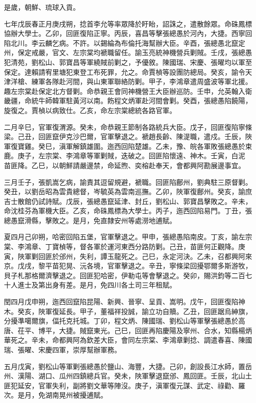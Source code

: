 \begin{pinyinscope}
是歲，朝鮮、琉球入貢。

七年戊辰春正月庚戌朔，捻首李允等率眾降於盱眙，詔誅之，遣散餘眾。命硃鳳標協辦大學士。乙卯，回匪復陷正寧。丙辰，喜昌等擊張總愚於河內，大捷。西寧回陷北川。李云麟乞病。不許。以錫綸為布倫托海幫辦大臣。辛酉，張總愚北竄定州，保定戒嚴，官文、左宗棠均褫職留任。諭玉亮統神機營兵剿賊。壬戌，張總愚犯清苑，劉松山、郭寶昌等軍繞賊前剿之，予優敘。陳國瑞、宋慶、張曜均以軍至保定。達賴請宥里塘犯東登工布死罪，允之。命賈楨等設團防總局。癸亥，諭令天津洋槍、練軍各隊赴河間，與山東軍聯絡防剿。甲子，李鴻章遣周盛波等軍北援。趣左宗棠赴保定北方督剿。命恭親王會同神機營王大臣辦巡防。壬申，允英翰入衛畿疆，命統牛師韓軍駐黃河以南。飭程文炳軍赴河間會剿。癸酉，張總愚陷饒陽，旋復之。賈楨以病致仕。乙亥，命左宗棠總統各路官軍。

二月辛巳，官軍復渭源。癸未，命恭親王節制各路統兵大臣。戊子，回匪復陷寧條梁。己丑，回匪竄伊克沙巴爾，官軍擊退之。褫趙長齡、陳湜職，遣戍。壬辰，陜軍復寶雞。癸巳，滇軍解鎮雄圍。迤西回陷楚雄。乙未，豫、皖各軍敗張總愚於束鹿。庚子，左宗棠、李鴻章等軍剿賊，迭破之。回匪陷懷遠、神木。壬寅，白泥苗匪降。乙巳，以朝鮮請嚴邊禁，命延煦、奕榕赴奉天，會都興阿勘展邊事宜。

三月壬子，張凱嵩乞病，諭責其逗留規避，褫職。回匪陷鄜州，劉典駐三原督剿。癸丑，以劉岳昭為雲貴總督，岑毓英為雲南巡撫。乙卯，陜軍復鄜州。癸亥，諭庶吉士散館仍試詩賦。戊辰，張總愚竄延津、封丘，劉松山、郭寶昌擊敗之。辛未，命沈桂芬為軍機大臣。乙亥，命硃鳳標為大學士。丙子，迤西回陷易門。丁丑，張總愚竄滑縣，擊敗之。是月，免直隸安州等處澇地逋賦。

夏四月己卯朔，哈密回陷五堡，官軍擊退之。甲申，張總愚陷南皮。丁亥，諭左宗棠、李鴻章、丁寶楨等，督各軍於運河東西分路防剿。己丑，苗匪何正觀降。庚寅，陜軍剿回匪於邠州，失利，譚玉龍死之。己巳，永定河決。乙未，召都興阿來京。戊戌，黎平苗犯晃、沅各境，官軍擊退之。辛丑，寧條梁回擾鄂爾多斯游牧，貝子札那格爾濟擊退之。回匪犯哈密，伊勒屯等會擊退之。癸卯，賜洪鈞等二百七十人進士及第出身有差。是月，免四川各土司三年租賦。

閏四月戊申朔，迤西回竄陷昆陽、新興、晉寧、呈貢、嵩明。戊午，回匪復陷神木。癸亥，陜軍復延長。甲子，董福祥投誠，諭立功自贖。乙丑，回匪踞烏紳旗，分擾準噶爾旗，偪托克托城。丁卯，程文炳、陳國瑞、劉松山等軍擊張總愚於高唐、茌平、博平，大捷。賊竄東光。己巳，回匪再陷慶陽及寧州、合水，知縣楊炳華死之。辛未，命都興阿為欽差大臣，會同左宗棠、李鴻章剿捻、調遣春喜、陳國瑞、張曜、宋慶四軍，崇厚幫辦軍務。

五月戊寅，劉松山等軍剿張總愚於鹽山、海豐，大捷。己卯，創設長江水師，置岳州、漢陽、湖口、瓜州四鎮總兵官。癸未，陜軍擊退竄邠、鳳回匪。壬辰，北山土匪犯延安，官軍失利，副將劉文華等陣沒。庚子，滇軍復元謀、武定、祿勸、羅次。是月，免湖南晃州被擾逋賦。


\end{pinyinscope}
